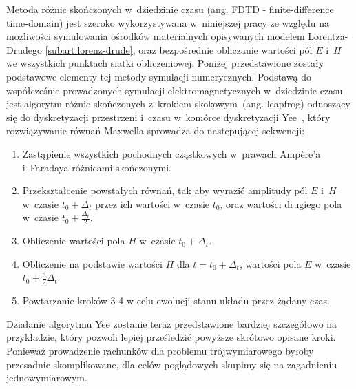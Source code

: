 \label{subart:fdtd}
Metoda różnic skończonych w~dziedzinie czasu (ang. FDTD - finite-difference time-domain) jest szeroko wykorzystywana w~niniejszej pracy ze względu na możliwości symulowania ośrodków materialnych opisywanych modelem Lorentza-Drudego \ref{subart:lorenz-drude}, oraz bezpośrednie obliczanie wartości pól $E$ i~$H$ we wszystkich punktach siatki obliczeniowej. Poniżej przedstawione zostały podstawowe elementy tej metody symulacji numerycznych. Podstawą do współcześnie prowadzonych symulacji elektromagnetycznych w~dziedzinie czasu jest algorytm różnic skończonych z~krokiem skokowym~(ang. leapfrog)  odnoszący się do dyskretyzacji przestrzeni i~czasu w~komórce dyskretyzacji Yee~\cite{1966ITAP14302Y}, który rozwiązywanie równań Maxwella sprowadza do następującej sekwencji:
\begin{enumerate}
\item Zastąpienie wszystkich pochodnych cząstkowych w~prawach Amp\`{e}re'a i~Faradaya różnicami skończonymi.
\item Przekształcenie powstałych równań, tak aby wyrazić amplitudy pól $E$ i~$H$ w~czasie $t_0 +  \Delta_t$ przez ich wartości w~czasie $t_0$, oraz wartości drugiego pola w~czasie $t_0+ \frac{\Delta_t}{2}$.
\item Obliczenie wartości pola $H$ w~czasie $t_0 +  \Delta_t$.
\item Obliczenie na podstawie wartości $H$ dla $t=t_0+  \Delta_t$, wartości pola $E$ w~czasie $t_0 + \frac{3}{2} \Delta_t$.
\item Powtarzanie kroków 3-4 w celu ewolucji stanu układu przez żądany czas.
\end{enumerate}
Działanie algorytmu Yee zostanie teraz przedstawione bardziej szczegółowo na przykładzie, który pozwoli lepiej prześledzić powyższe skrótowo opisane kroki. Ponieważ prowadzenie rachunków dla problemu trójwymiarowego byłoby przesadnie skomplikowane, dla celów poglądowych skupimy się na zagadnieniu jednowymiarowym.

